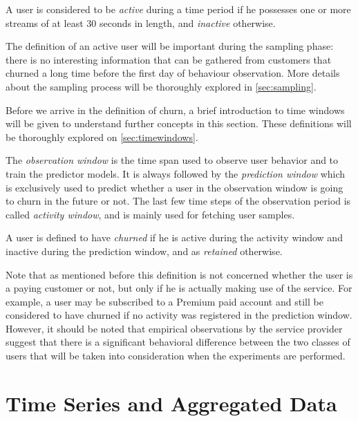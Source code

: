 \documentclass{kththesis}
\begin{document}
\begin{definition}
A user is considered to be \emph{active} during a time period if he possesses one or more streams of at least 30 seconds in length, and \emph{inactive} otherwise.
\end{definition}

The definition of an active user will be important during the sampling phase: there is no interesting information that can be gathered from customers that churned a long time before the first day of behaviour observation. More details about the sampling process will be thoroughly explored in \autoref{sec:sampling}.

Before we arrive in the definition of churn, a brief introduction to time windows will be given to understand further concepts in this section. These definitions will be thoroughly explored on \autoref{sec:timewindows}.

\begin{definition}
The \emph{observation window} is the time span used to observe user behavior and to train the predictor models. It is always followed by the \emph{prediction window} which is exclusively used to predict whether a user in the observation window is going to churn in the future or not. The last few time steps of the observation period is called \emph{activity window}, and is mainly used for fetching user samples.
\end{definition}

\begin{definition}
\label{def:churn}
A user is defined to have \emph{churned} if he is active during the activity window and inactive during the prediction window, and as \emph{retained} otherwise.
\end{definition}

Note that as mentioned before this definition is not concerned whether the user is a paying customer or not, but only if he is actually making use of the service. For example, a user may be subscribed to a Premium paid account and still be considered to have churned if no activity was registered in the prediction window. However, it should be noted that empirical observations by the service provider suggest that there is a significant behavioral difference between the two classes of users that will be taken into consideration when the experiments are performed. 

\section{Time Series and Aggregated Data}
\label{sec:timewindows}
\end{document}
